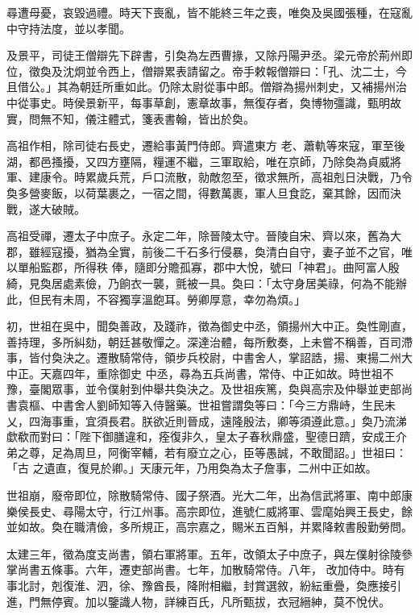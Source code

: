 \begin{pinyinscope}
 尋遭母憂，哀毀過禮。時天下喪亂，皆不能終三年之喪，唯奐及吳國張種，在寇亂
 中守持法度，並以孝聞。



 及景平，司徒王僧辯先下辟書，引奐為左西曹掾，又除丹陽尹丞。梁元帝於荊州即位，徵奐及沈炯並令西上，僧辯累表請留之。帝手敕報僧辯曰：「孔、沈二士，今且借公。」其為朝廷所重如此。仍除太尉從事中郎。僧辯為揚州刺史，又補揚州治中從事史。時侯景新平，每事草創，憲章故事，無復存者，奐博物彊識，甄明故實，問無不知，儀注體式，箋表書翰，皆出於奐。



 高祖作相，除司徒右長史，遷給事黃門侍郎。齊遣東方
 老、蕭軌等來寇，軍至後湖，都邑搔擾，又四方壅隔，糧運不繼，三軍取給，唯在京師，乃除奐為貞威將軍、建康令。時累歲兵荒，戶口流散，勍敵忽至，徵求無所，高祖剋日決戰，乃令奐多營麥飯，以荷葉裹之，一宿之間，得數萬裹，軍人旦食訖，棄其餘，因而決戰，遂大破賊。



 高祖受禪，遷太子中庶子。永定二年，除晉陵太守。晉陵自宋、齊以來，舊為大郡，雖經寇擾，猶為全實，前後二千石多行侵暴，奐清白自守，妻子並不之官，唯以單船監郡，所得秩
 俸，隨即分贍孤寡，郡中大悅，號曰「神君」。曲阿富人殷綺，見奐居處素儉，乃餉衣一襲，氈被一具。奐曰：「太守身居美祿，何為不能辦此，但民有未周，不容獨享溫飽耳。勞卿厚意，幸勿為煩。」



 初，世祖在吳中，聞奐善政，及踐祚，徵為御史中丞，領揚州大中正。奐性剛直，善持理，多所糾劾，朝廷甚敬憚之。深達治體，每所敷奏，上未嘗不稱善，百司滯事，皆付奐決之。遷散騎常侍，領步兵校尉，中書舍人，掌詔誥，揚、東揚二州大中正。天嘉四年，重除御史
 中丞，尋為五兵尚書，常侍、中正如故。時世祖不豫，臺閣眾事，並令僕射到仲舉共奐決之。及世祖疾篤，奐與高宗及仲舉並吏部尚書袁樞、中書舍人劉師知等入侍醫藥。世祖嘗謂奐等曰：「今三方鼎峙，生民未乂，四海事重，宜須長君。朕欲近則晉成，遠隆殷法，卿等須遵此意。」奐乃流涕歔欷而對曰：「陛下御膳違和，痊復非久，皇太子春秋鼎盛，聖德日躋，安成王介弟之尊，足為周旦，阿衡宰輔，若有廢立之心，臣等愚誠，不敢聞詔。」世祖曰：「古
 之遺直，復見於卿。」天康元年，乃用奐為太子詹事，二州中正如故。



 世祖崩，廢帝即位，除散騎常侍、國子祭酒。光大二年，出為信武將軍、南中郎康樂侯長史、尋陽太守，行江州事。高宗即位，進號仁威將軍、雲麾始興王長史，餘並如故。奐在職清儉，多所規正，高宗嘉之，賜米五百斛，并累降敕書殷勤勞問。



 太建三年，徵為度支尚書，領右軍將軍。五年，改領太子中庶子，與左僕射徐陵參掌尚書五條事。六年，遷吏部尚書。七年，加散騎常侍。八年，
 改加侍中。時有事北討，剋復淮、泗，徐、豫酋長，降附相繼，封賞選敘，紛紜重疊，奐應接引進，門無停賓。加以鑒識人物，詳練百氏，凡所甄拔，衣冠縉紳，莫不悅伏。




\end{pinyinscope}
